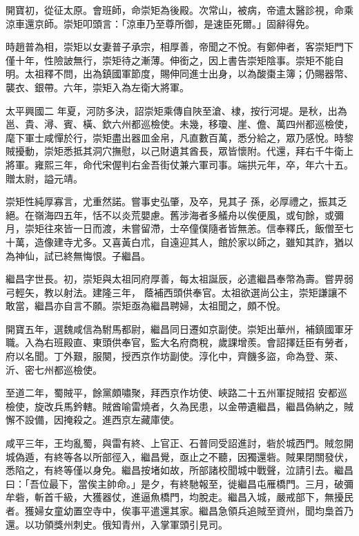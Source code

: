 \begin{pinyinscope}
 開寶初，從征太原。會班師，命崇矩為後殿。次常山，被病，帝遣太醫診視，命乘涼車還京師。崇矩叩頭言：「涼車乃至尊所御，是速臣死爾。」固辭得免。



 時趙普為相，崇矩以女妻普子承宗，相厚善，帝聞之不悅。有鄭伸者，客崇矩門下僅十年，性險詖無行，崇矩待之漸薄。伸銜之，因上書告崇矩陰事。崇矩不能自明。太祖釋不問，出為鎮國軍節度，賜伸同進士出身，以為酸棗主簿；仍賜器幣、襲衣、銀帶。六年，崇矩入為左衛大將軍。



 太平興國二
 年夏，河防多決，詔崇矩乘傳自陜至滄、棣，按行河堤。是秋，出為邕、貴、潯、賓、橫、欽六州都巡檢使。未幾，移瓊、崖、儋、萬四州都巡檢使，麾下軍士咸憚於行，崇矩盡出器皿金帛，凡直數百萬，悉分給之，眾乃感悅。時黎賊擾動，崇矩悉抵其洞穴撫慰，以己財遺其酋長，眾皆懷附。代還，拜右千牛衛上將軍。雍熙三年，命代宋偓判右金吾街仗兼六軍司事。端拱元年，卒，年六十五。贈太尉，謚元靖。



 崇矩性純厚寡言，尤重然諾。嘗事史弘肇，及卒，見其子
 孫，必厚禮之，振其乏絕。在嶺海四五年，恬不以炎荒嬰慮。舊涉海者多艤舟以俟便風，或旬餘，或彌月，崇矩往來皆一日而渡，未嘗留滯，士卒僮僕隨者皆無恙。信奉釋氏，飯僧至七十萬，造像建寺尤多。又喜黃白朮，自遠迎其人，館於家以師之，雖知其詐，猶以為神仙，試已終無悔恨。子繼昌。



 繼昌字世長。初，崇矩與太祖同府厚善，每太祖誕辰，必遣繼昌奉幣為壽。嘗畀弱弓輕矢，教以射法。建隆三年，
 蔭補西頭供奉官。太祖欲選尚公主，崇矩謙讓不敢當，繼昌亦自言不願。崇矩亟為繼昌聘婦，太祖聞之，頗不悅。



 開寶五年，選魏咸信為駙馬都尉，繼昌同日遷如京副使。崇矩出華州，補鎮國軍牙職。入為右班殿直、東頭供奉官，監大名府商稅，歲課增羨。會詔擇廷臣有勞者，府以名聞。丁外艱，服闋，授西京作坊副使。淳化中，齊饑多盜，命為登、萊、沂、密七州都巡檢使。



 至道二年，蜀賊平，餘黨頗嘯聚，拜西京作坊使、峽路二十五州軍捉賊招
 安都巡檢使，旋改兵馬鈐轄。賊酋喻雷燒者，久為民患，以金帶遺繼昌，繼昌偽納之，賊懈不設備，因掩殺之。進西京左藏庫使。



 咸平三年，王均亂蜀，與雷有終、上官正、石普同受詔進討，砦於城西門。賊忽開城偽遁，有終等各以所部徑入，繼昌覺，亟止之不聽，因獨還砦。賊果閉關發伏，悉陷之，有終等僅以身免。繼昌按堵如故，所部諸校聞城中戰聲，泣請引去。繼昌曰：「吾位最下，當俟主帥命。」是夕，有終馳報至，徙繼昌屯雁橋門。三月，破彌
 牟砦，斬首千級，大獲器仗，進逼魚橋門，均脫走。繼昌入城，嚴戒部下，無擾民者。獲婦女童幼置空寺中，俟事平遣還其家。繼昌急領兵追賊至資州，聞均梟首乃還。以功領獎州刺史。俄知青州，入掌軍頭引見司。




\end{pinyinscope}
